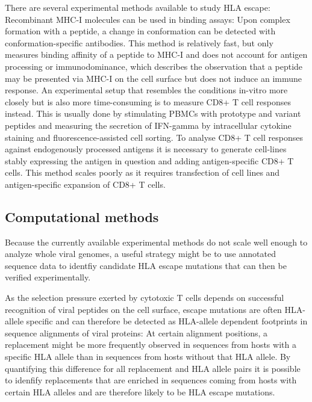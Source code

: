\documentclass[fleqn,11pt]{SelfArx} %
\begin{document}
There are several experimental methods available to study HLA escape:
Recombinant MHC-I molecules can be used in binding assays: Upon complex formation
with a peptide, a change in conformation can be detected with conformation-specific
antibodies. This method is relatively fast, but only measures binding affinity of a
peptide to MHC-I and does not account for antigen processing or immunodominance, 
which describes the observation that a peptide may be presented via MHC-I on the cell surface but does
not induce an immune response.
An experimental setup that resembles the conditions in-vitro more closely but is also
more time-consuming is to measure
CD8+ T cell responses instead. This is usually done by stimulating PBMCs with prototype
and variant peptides and measuring the secretion of IFN-gamma by intracellular cytokine
staining and fluorescence-assisted cell sorting.
To analyse CD8+ T cell responses against endogenously processed antigens it is necessary
to generate cell-lines stably expressing the antigen in question and adding antigen-specific
CD8+ T cells. This method scales poorly as it requires transfection of cell lines and
antigen-specific expansion of CD8+ T cells.

\subsection{Computational methods}

Because the currently available experimental methods do not scale well enough to analyze
whole viral genomes, a useful strategy might be to use annotated sequence data to identfiy 
candidate HLA escape mutations that can then be verified experimentally.

As the selection pressure exerted by cytotoxic T cells depends on successful recognition
of viral peptides on the cell surface, escape mutations are often HLA-allele specific
and can therefore  be detected as HLA-allele dependent footprints in sequence
alignments of viral proteins: At certain alignment positions, a replacement
might be more frequently observed in sequences from hosts with a specific HLA allele than in 
sequences from hosts without that HLA allele. By quantifying this difference
for all replacement and HLA allele pairs it is possible to idenfify replacements that
are enriched in sequences coming from hosts with certain HLA alleles and are therefore
likely to be HLA escape mutations.
\end{document}

